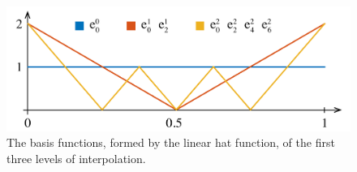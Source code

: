 \begin{figure}
  \centering
  \includegraphics[width=1.0\columnwidth]{include/assets/basis.pdf}
  \caption{
    The basis functions, formed by the linear hat function, of the first three
    levels of interpolation.
  }
\end{figure}
